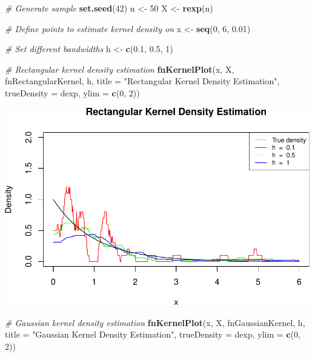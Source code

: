 \documentclass[10pt,]{article}
\newenvironment{Shaded}{\begin{snugshade}}{\end{snugshade}}
\newcommand{\KeywordTok}[1]{\textcolor[rgb]{0.13,0.29,0.53}{\textbf{{#1}}}}
\newcommand{\DataTypeTok}[1]{\textcolor[rgb]{0.13,0.29,0.53}{{#1}}}
\newcommand{\DecValTok}[1]{\textcolor[rgb]{0.00,0.00,0.81}{{#1}}}
\newcommand{\FloatTok}[1]{\textcolor[rgb]{0.00,0.00,0.81}{{#1}}}
\newcommand{\StringTok}[1]{\textcolor[rgb]{0.31,0.60,0.02}{{#1}}}
\newcommand{\CommentTok}[1]{\textcolor[rgb]{0.56,0.35,0.01}{\textit{{#1}}}}
\newcommand{\NormalTok}[1]{{#1}}
\begin{document}
\begin{Shaded}
\begin{Highlighting}[]
\CommentTok{# Generate sample}
\KeywordTok{set.seed}\NormalTok{(}\DecValTok{42}\NormalTok{)}
\NormalTok{n <-}\StringTok{ }\DecValTok{50}
\NormalTok{X <-}\StringTok{ }\KeywordTok{rexp}\NormalTok{(n)}

\CommentTok{# Define points to estimate kernel density on}
\NormalTok{x <-}\StringTok{ }\KeywordTok{seq}\NormalTok{(}\DecValTok{0}\NormalTok{, }\DecValTok{6}\NormalTok{, }\FloatTok{0.01}\NormalTok{)}

\CommentTok{# Set different bandwidths}
\NormalTok{h <-}\StringTok{ }\KeywordTok{c}\NormalTok{(}\FloatTok{0.1}\NormalTok{, }\FloatTok{0.5}\NormalTok{, }\DecValTok{1}\NormalTok{)}

\CommentTok{# Rectangular kernel density estimation}
\KeywordTok{fnKernelPlot}\NormalTok{(x, X, fnRectangularKernel, h, }
             \DataTypeTok{title =} \StringTok{"Rectangular Kernel Density Estimation"}\NormalTok{,}
             \DataTypeTok{trueDensity =} \NormalTok{dexp, }\DataTypeTok{ylim =} \KeywordTok{c}\NormalTok{(}\DecValTok{0}\NormalTok{, }\DecValTok{2}\NormalTok{))}
\end{Highlighting}
\end{Shaded}

\includegraphics{project2_files/figure-latex/Kernel density estimation for the exponential-1.pdf}

\begin{Shaded}
\begin{Highlighting}[]
\CommentTok{# Gaussian kernel density estimation}
\KeywordTok{fnKernelPlot}\NormalTok{(x, X, fnGaussianKernel, h, }
             \DataTypeTok{title =} \StringTok{"Gaussian Kernel Density Estimation"}\NormalTok{,}
             \DataTypeTok{trueDensity =} \NormalTok{dexp, }\DataTypeTok{ylim =} \KeywordTok{c}\NormalTok{(}\DecValTok{0}\NormalTok{, }\DecValTok{2}\NormalTok{))}
\end{Highlighting}
\end{Shaded}
\end{document}
